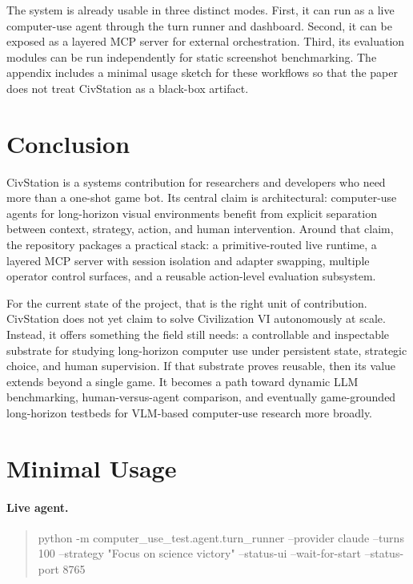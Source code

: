 The system is already usable in three distinct modes. First, it can run as a live computer-use agent through the turn runner and dashboard. Second, it can be exposed as a layered MCP server for external orchestration. Third, its evaluation modules can be run independently for static screenshot benchmarking. The appendix includes a minimal usage sketch for these workflows so that the paper does not treat CivStation as a black-box artifact.

\section{Conclusion}

CivStation is a systems contribution for researchers and developers who need more than a one-shot game bot. Its central claim is architectural: computer-use agents for long-horizon visual environments benefit from explicit separation between context, strategy, action, and human intervention. Around that claim, the repository packages a practical stack: a primitive-routed live runtime, a layered MCP server with session isolation and adapter swapping, multiple operator control surfaces, and a reusable action-level evaluation subsystem.

For the current state of the project, that is the right unit of contribution. CivStation does not yet claim to solve Civilization VI autonomously at scale. Instead, it offers something the field still needs: a controllable and inspectable substrate for studying long-horizon computer use under persistent state, strategic choice, and human supervision. If that substrate proves reusable, then its value extends beyond a single game. It becomes a path toward dynamic LLM benchmarking, human-versus-agent comparison, and eventually game-grounded long-horizon testbeds for VLM-based computer-use research more broadly.

\appendix

\section{Minimal Usage}

\paragraph{Live agent.}
\begin{quote}
\ttfamily
python -m computer\_use\_test.agent.turn\_runner --provider claude --turns 100 --strategy "Focus on science victory" --status-ui --wait-for-start --status-port 8765
\end{quote}

